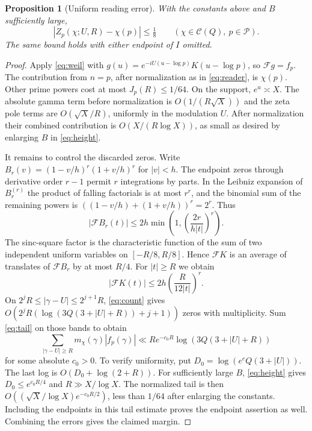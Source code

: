 \documentclass[11pt,letterpaper]{article}
\newtheorem{proposition}[theorem]{Proposition}
\newcommand{\F}{\mathcal F}\newcommand{\Pp}{\mathcal P}
\begin{document}
\begin{proposition}[Uniform reading error]\label{prop:read}
With the constants above and $B$ sufficiently large,
\[
 |Z_p(\chi;U,R)-\chi(p)|\le\tfrac18
 \qquad(\chi\in\mathcal C(Q),\ p\in\Pp).
\]
The same bound holds with either endpoint of $I$ omitted.
\end{proposition}
\begin{proof}
Apply \eqref{eq:weil} with $g(u)=e^{-iU(u-\log p)}K(u-\log p)$, so $\F g=f_p$. The contribution from $n=p$, after normalization as in \eqref{eq:reader}, is $\chi(p)$. Other prime powers cost at most $J_p(R)\le1/64$. On the support, $e^u\asymp X$. The absolute gamma term before normalization is $O(1/(R\sqrt X))$ and the zeta pole terms are $O(\sqrt X/R)$, uniformly in the modulation $U$. After normalization their combined contribution is $O(X/(R\log X))$, as small as desired by enlarging $B$ in \eqref{eq:height}.

It remains to control the discarded zeros. Write $B_r(v)=(1-v/h)^r(1+v/h)^r$ for $|v|<h$. The endpoint zeros through derivative order $r-1$ permit $r$ integrations by parts. In the Leibniz expansion of $B_r^{(r)}$ the product of falling factorials is at most $r^r$, and the binomial sum of the remaining powers is $((1-v/h)+(1+v/h))^r=2^r$. Thus
\[
 |\F B_r(t)|\le 2h\min\left(1,\left(\frac{2r}{h|t|}\right)^r\right).
\]
The sinc-square factor is the characteristic function of the sum of two independent uniform variables on $[-R/8,R/8]$. Hence $\F K$ is an average of translates of $\F B_r$ by at most $R/4$. For $|t|\ge R$ we obtain
\begin{equation}\label{eq:tail}
 |\F K(t)|\le2h\left(\frac R{12|t|}\right)^r.
\end{equation}
On $2^jR\le |\gamma-U|\le2^{j+1}R$, \eqref{eq:count} gives $O(2^jR(\log(3Q(3+|U|+R))+j+1))$ zeros with multiplicity. Sum \eqref{eq:tail} on those bands to obtain
\[
 \sum_{|\gamma-U|\ge R}m_\chi(\gamma)|f_p(\gamma)|
 \ll R e^{-c_0 R}\log(3Q(3+|U|+R))
\]
for some absolute $c_0>0$. To verify uniformity, put $D_0=\log(e^eQ(3+|U|))$. The last log is $O(D_0+\log(2+R))$. For sufficiently large $B$, \eqref{eq:height} gives $D_0\le e^{c_0R/4}$ and $R\gg X/\log X$. The normalized tail is then $O((\sqrt X/\log X)e^{-c_0R/2})$, less than $1/64$ after enlarging the constants. Including the endpoints in this tail estimate proves the endpoint assertion as well. Combining the errors gives the claimed margin.
\end{proof}
\end{document}
